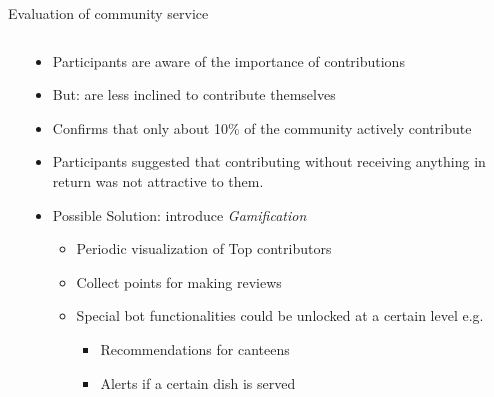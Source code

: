 \begin{frame}{Evaluation of community service}
  \begin{columns}
    \begin{column}[t]{0.5\textwidth}
      
    \end{column}
    \begin{column}[t]{0.5\textwidth}
      \begin{itemize}
        \item Participants are aware of the importance of contributions
        \item But: are less inclined to contribute themselves
        \item Confirms that only about 10\% of the community actively contribute \cite{Kers20}
       \item Participants suggested that contributing without receiving anything in return was not attractive to them.
        \item Possible Solution: introduce \emph{Gamification}
        \begin{itemize}
          \item Periodic visualization of Top contributors 
          \item Collect points for making reviews
          \item Special bot functionalities could be unlocked at a certain level e.g.
          \begin{itemize}
            \item Recommendations for canteens
            \item Alerts if a certain dish is served
          \end{itemize} 
        \end{itemize}
      \end{itemize}
    \end{column}
  \end{columns}
\end{frame}

